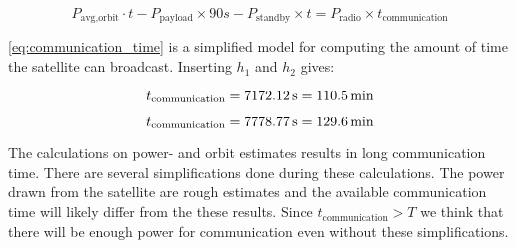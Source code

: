 \begin{equation}
P_{\text{avg,orbit}}\cdot t - P_{\text{payload}}\times 90 s - P_{\text{standby}}\times t= P_{\text{radio}}\times t_{\text{communication}}
\label{eq:communication_time}
\end{equation}

\autoref{eq:communication_time} is a simplified model for computing the amount of time the satellite can broadcast. Inserting $h_1$ and $h_2$ gives:

\begin{equation}
t_{\text{communication}} = \unit[7172.12]{s} =\unit[110.5]{min}
\end{equation}

\begin{equation}
t_{\text{communication}} = \unit[7778.77]{s} =\unit[129.6]{min}
\end{equation}

The calculations on power- and orbit estimates results in long communication time. There are several simplifications done during these calculations. The power drawn from the satellite are rough estimates and the available communication time will likely differ from the these results. Since $t_{\text{communication}}>T$ we think that there will be enough power for communication even without these simplifications.
